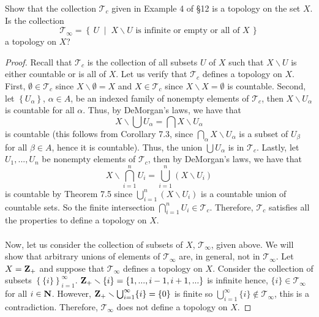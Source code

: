 \begin{problem}[Munkres, \S13, 3.]
Show that the collection $\mathcal{T}_c$ given in
Example 4 of \S12 is a topology on the set $X$. Is the collection
\[
\mathcal{T}_\infty=
\left\{\,U\;\middle|\;
\text{$X\smallsetminus U$ is infinite or empty or all of $X$}
\,\right\}
\]
a topology on $X$?
\end{problem}
\begin{proof}
Recall that $\mathcal{T}_c$ is the collection of all subsets $U$
of $X$ such that $X\smallsetminus U$ is either countable or is
all of $X$. Let us verify that $\mathcal{T}_c$ defines a topology
on $X$. First, $\emptyset\in\mathcal{T}_c$ since
$X\smallsetminus\emptyset=X$ and $X\in\mathcal{T}_c$ since
$X\smallsetminus X=\emptyset$ is countable. Second, let
$\left\{U_\alpha\right\}$, $\alpha\in A$, be an indexed
family of nonempty elements of $\mathcal{T}_c$, then
$X\smallsetminus U_\alpha$ is countable for all $\alpha$. Thus,
by DeMorgan's laws, we have that
\[
X\smallsetminus\bigcup U_\alpha=\bigcap X\smallsetminus U_\alpha
\]
is countable (this follows from Corollary 7.3, since
$\bigcap_\alpha X\smallsetminus U_\alpha$ is a subset of
$U_\beta$ for all $\beta\in A$, hence it is countable). Thus, the
union $\bigcup U_\alpha$ is in $\mathcal{T}_c$. Lastly, let
$U_1,...,U_n$ be nonempty elements of $\mathcal{T}_c$, then by
DeMorgan's laws, we have that
\[
X\smallsetminus\bigcap_{i=1}^n U_i=\bigcup_{i=1}^n (X\smallsetminus U_i)
\]
is countable by Theorem 7.5 since
$\bigcup_{i=1}^n(X\smallsetminus U_i)$ is a countable union of
countable sets. So the finite intersection
$\bigcap_{i=1}^nU_i\in\mathcal{T}_c$. Therefore, $\mathcal{T}_c$
satisfies all the properties to define a topology on $X$.
\\\\
Now, let us consider the collection of subsets of $X$,
$\mathcal{T}_\infty$, given above. We will show that arbitrary
unions of elements of $\mathcal{T}_\infty$ are, in general, not
in $\mathcal{T}_\infty$. Let $X=\mathbf{Z}_+$ and suppose that
$\mathcal{T}_\infty$ defines a topology on $X$. Consider the
collection of subsets
$\left\{\{i\}\right\}_{i=1}^\infty$. $\mathbf{Z}_+\smallsetminus\{i\}=\left\{1,...,i-1,i+1,...\right\}$
is infinite hence, $\{i\}\in\mathcal{T}_\infty$ for all
$i\in\mathbf{N}$. However,
$\mathbf{Z}_+\smallsetminus\bigcup_{i=1}^\infty\{i\}=\{0\}$ is finite so
$\bigcup_{i=1}^\infty\{i\}\notin\mathcal{T}_\infty$, this is a
contradiction. Therefore, $\mathcal{T}_\infty$ does not define a
topology on $X$.
\end{proof}
\newpage

